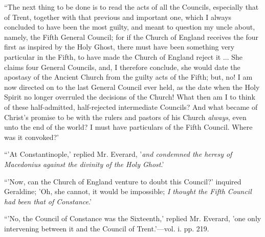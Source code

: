 ``The next thing to be done is to
read the acts of all the Councils, especially that of Trent, together
with that previous and important one, which I always concluded to have
been the most guilty, and meant to question my uncle about, namely, the
Fifth General Council; for if the Church of England receives the four
first as inspired by the Holy Ghost, there must have been something very
particular in the Fifth, to have made the Church of England reject it
... She claims four General Councils, and, I therefore conclude, she
would date the apostasy of the Ancient Church from the guilty acts of
the Fifth; but, no! I am now directed on to the last General Council
ever held, as the date when the Holy Spirit no longer overruled the
decisions of the Church! What then am I to think of these half-admitted,
half-rejected intermediate Councils? And what became of Christ's promise
to be with the rulers and pastors of his Church \emph{always}, even unto
the end of the world? I must have particulars of the Fifth Council.
Where was it convoked?'

``'At Constantinople,' replied Mr.
Everard, '\emph{and condemned the heresy of Macedonius against the divinity
of the Holy Ghost}.'

``'Now, can the Church of England
venture to doubt this Council?' inquired Geraldine; 'Oh, she cannot, it
would be impossible; \emph{I thought the Fifth Council had been that of
Constance}.'

``'No, the Council of Constance was
the Sixteenth,' replied Mr. Everard, 'one only intervening between it
and the Council of Trent.'—vol. i. pp. 219.

